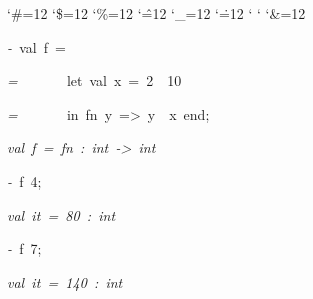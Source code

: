 \begin{list}{}
{\setlength{\leftmargin}{\leftmargini}
\setlength{\rightmargin}{0cm}
\setlength{\itemindent}{0cm}
\setlength{\listparindent}{0cm}
\setlength{\itemsep}{0cm}
\setlength{\parsep}{0cm}
\setlength{\labelsep}{0cm}
\setlength{\labelwidth}{0cm}
\catcode`\#=12
\catcode`\$=12
\catcode`\%=12
\catcode`\^=12
\catcode`\_=12
\catcode`\.=12
\catcode`
\catcode`
\catcode`\&=12
\ttfamily}
\small
\item[]\textsl{-\ }val\ f\ =
\item[]\textsl{=\ }\ \ \ \ \ \ let\ val\ x\ =\ 2\ \ 10
\item[]\textsl{=\ }\ \ \ \ \ \ in\ fn\ y\ =>\ y\ \ x\ end;
\item[]\textsl{val\ f\ =\ fn\ :\ int\ ->\ int}
\item[]\textsl{-\ }f\ 4;
\item[]\textsl{val\ it\ =\ 80\ :\ int}
\item[]\textsl{-\ }f\ 7;
\item[]\textsl{val\ it\ =\ 140\ :\ int}
\end{list}
